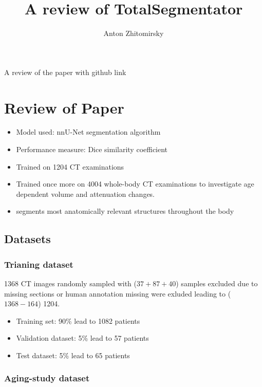 \documentclass[11pt]{article}
\title{A review of TotalSegmentator}
\author{Anton Zhitomirsky}
\begin{document}
\maketitle 

A review of the paper \cite{totalsegmentor-paper} with github link \cite{totalsegmentor-git}

\section{Review of Paper}

\begin{itemize}
    \item Model used: nnU-Net segmentation algorithm
    \item Performance measure: Dice similarity coefficient
    \item Trained on 1204 CT examinations
    \item Trained once more on 4004 whole-body CT examinations to investigate age dependent volume and attenuation changes.
    \item segments most anatomically relevant structures
    throughout the body
\end{itemize}

\subsection{Datasets}

\subsubsection{Trianing dataset}

1368 CT images randomly sampled with ($37 + 87 + 40$) samples excluded due to missing sections or human annotation missing were exluded leading to ($1368-164$) 1204.

\begin{itemize}
    \item Training set: 90\% lead to 1082 patients
    \item Validation dataset: 5\% lead to 57 patients
    \item Test dataset: 5\% lead to 65 patients
\end{itemize}

\subsubsection{Aging-study dataset}
\end{document}
